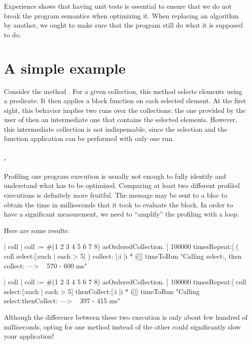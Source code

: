 \documentclass[a4paper,10pt,twoside]{book}
\begin{document}
Experience shows that having unit tests is essential to ensure that we do not break the program semantics when optimizing it. When replacing an algorithm by another, we ought to make sure that the program still do what it is supposed to do.


\section{A simple example}

Consider the method . For a given collection, this method selects elements using a predicate. It then applies a block function on each selected element. At the first sight, this behavior implies two runs over the collections: the one provided by the user of  then an intermediate one that contains the selected elements. However, this intermediate collection is not indispensable, since the selection and the function application can be performed with only one run.

\paragraph{.} Profiling one program execution is usually not enough to fully identify and understand what has to be optimized. Comparing at least two different profiled executions is definitely more fruitful. The message  may be sent to a bloc to obtain the time in milliseconds that it took to evaluate the block. In order to have a significant measurement, we need to ``amplify'' the profiling with a loop.

Here are some results:
\begin{code}{}
	| coll |
	coll := #(1 2 3 4 5 6 7 8) asOrderedCollection. 
	[ 100000 timesRepeat:[ ( coll select:[:each | each > 5] ) collect: [:i |i * i]]] timeToRun
	"Calling select:, then collect: ---> ~ 570 - 600 ms"

	| coll |
	coll := #(1 2 3 4 5 6 7 8) asOrderedCollection. 
	[ 100000 timesRepeat:[ coll select:[:each | each > 5] thenCollect:[:i |i * i]]] timeToRun
	"Calling select:thenCollect: ---> ~ 397 - 415 ms"
\end{code}

Although the difference between these two execution is only about few hundred of milliseconds, opting for one method instead of the other could significantly slow your application!
\end{document}

